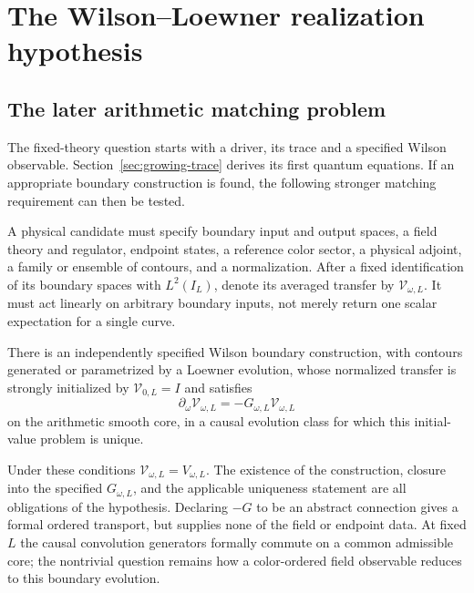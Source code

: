 \section{The Wilson--Loewner realization hypothesis}\label{sec:realization}

\subsection{The later arithmetic matching problem}

The fixed-theory question starts with a driver, its trace and a specified
Wilson observable. Section~\ref{sec:growing-trace} derives its first
quantum equations. If an appropriate boundary construction is found,
the following stronger matching requirement can then be tested.

A physical candidate must specify boundary input and output spaces,
a field theory and regulator, endpoint states, a reference color
sector, a physical adjoint, a family or ensemble of contours, and a
normalization. After a fixed identification of its boundary spaces
with $L^2(I_L)$, denote its averaged transfer by
$\mathcal V_{\omega,L}$. It must act linearly on arbitrary boundary
inputs, not merely return one scalar expectation for a single curve.

\begin{hypothesis}\label{hyp:realization}
There is an independently specified Wilson boundary construction,
with contours generated or parametrized by a Loewner evolution,
whose normalized transfer is strongly initialized by
$\mathcal V_{0,L}=I$ and satisfies
\begin{equation}\label{eq:physical-flow}
 \partial_\omega\mathcal V_{\omega,L}
       =-G_{\omega,L}\mathcal V_{\omega,L}
\end{equation}
on the arithmetic smooth core, in a causal evolution class for
which this initial-value problem is unique.
\end{hypothesis}

Under these conditions $\mathcal V_{\omega,L}=V_{\omega,L}$.
The existence of the construction, closure into the specified
$G_{\omega,L}$, and the applicable uniqueness statement are all
obligations of the hypothesis. Declaring $-G$ to be an abstract
connection gives a formal ordered transport, but supplies none of
the field or endpoint data. At fixed $L$ the causal convolution
generators formally commute on a common admissible core; the nontrivial question remains how
a color-ordered field observable reduces to this boundary evolution.

